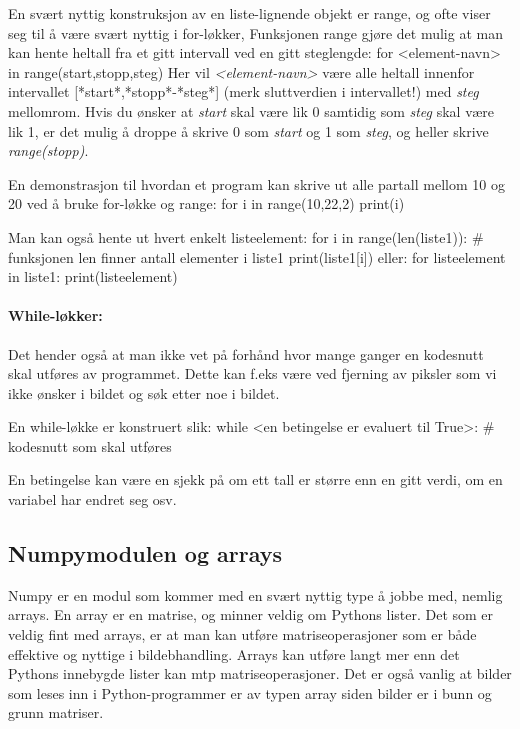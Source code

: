 \documentclass[%
oneside,                 %
final,                   %
10pt]{article}
\begin{document}
En svært nyttig konstruksjon av en liste-lignende objekt er range, og ofte viser seg til å være svært nyttig i for-løkker,
Funksjonen range gjøre det mulig at man kan hente heltall fra et gitt intervall ved en gitt steglengde:
\bpycod
for <element-navn> in range(start,stopp,steg)
\epycod
Her vil \emph{<element-navn>} være alle heltall innenfor intervallet [*start*,*stopp*-*steg*] (merk sluttverdien i intervallet!) med \emph{steg} mellomrom. Hvis du ønsker at \emph{start} skal være lik 0 samtidig som \emph{steg} skal være lik 1, er
det mulig å droppe å skrive 0 som \emph{start} og 1 som \emph{steg}, og heller skrive \emph{range(stopp)}.

En demonstrasjon til hvordan et program kan skrive ut alle partall mellom 10 og 20 ved å bruke for-løkke og range:
\bpycod
for i in range(10,22,2)
    print(i)
\epycod

Man kan også hente ut hvert enkelt listeelement:
\bpycod
for i in range(len(liste1)): # funksjonen len finner antall elementer i liste1
    print(liste1[i])
\epycod
eller:
\bpycod
for listeelement in liste1:
    print(listeelement)
\epycod

\paragraph{While-løkker:}
Det hender også at man ikke vet på forhånd hvor mange ganger en kodesnutt skal utføres av programmet. Dette kan f.eks være ved fjerning av piksler som vi ikke ønsker i bildet og søk etter noe i bildet.

En while-løkke er konstruert slik:
\bpycod
while <en betingelse er  evaluert til True>:
    # kodesnutt som skal utføres
\epycod

En betingelse kan være en sjekk på om ett tall er større enn en gitt verdi, om en variabel har endret seg osv.

\subsection{Numpymodulen og arrays}

Numpy er en modul som kommer med en svært nyttig type å jobbe med, nemlig arrays.
En array er en matrise, og minner veldig om Pythons lister. Det som er veldig fint med arrays, er at man kan utføre
matriseoperasjoner som er både effektive og nyttige i bildebhandling. Arrays kan utføre langt mer enn det Pythons innebygde lister kan mtp matriseoperasjoner.
Det er også vanlig at bilder som leses inn i Python-programmer
er av typen array siden bilder er i bunn og grunn matriser.
\end{document}
